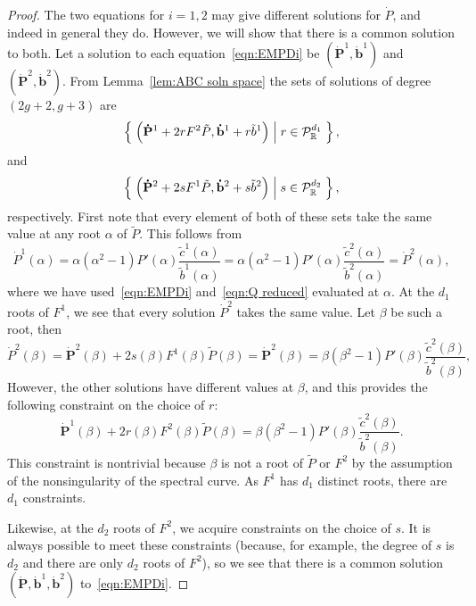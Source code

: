 \documentclass{article}
\begin{document}
\begin{lem}[Case (a)]
\begin{proof}
The two equations for $i=1,2$ may give different solutions for $\dot P$, and indeed in general they do. However, we will show that there is a common solution to both. Let a solution to each equation~\eqref{eqn:EMPDi} be $(\mathbf{\dot{P}}^1, \mathbf{\dot{b}}^1)$ and $(\mathbf{\dot{P}}^2, \mathbf{\dot{b}}^2)$. From Lemma~\ref{lem:ABC soln space} the sets of solutions of degree $(2g+2,g+3)$ are
\[
\left\{\;  \left( \mathbf{\dot{P}}^1 + 2rF^2\tilde{P}, \mathbf{\dot{b}}^1 + r\tilde{b}^1 \right)  \;\middle|\;  r \in\mathcal{P}^{d_1}_{\mathbb{R}}  \;\right\},
\]
and
\[
\left\{\;  \left( \mathbf{\dot{P}}^2 + 2sF^1\tilde{P}, \mathbf{\dot{b}}^2 + s\tilde{b}^2 \right)  \;\middle|\;  s \in\mathcal{P}^{d_2}_{\mathbb{R}} \;\right\},
\]
respectively. First note that every element of both of these sets take the same value at any root $\alpha$ of $\tilde{P}$. This follows from
\[
\dot P^1(\alpha)
= \alpha (\alpha^2 - 1) P'(\alpha) \frac{\tilde{c}^1(\alpha)}{\tilde{b}^1(\alpha)}
= \alpha (\alpha^2 - 1) P'(\alpha) \frac{\tilde{c}^2(\alpha)}{\tilde{b}^2(\alpha)}
= \dot P^2(\alpha),
\]
where we have used~\eqref{eqn:EMPDi} and~\eqref{eqn:Q reduced} evaluated at $\alpha$.
At the $d_1$ roots of $F^1$, we see that every solution $\dot{P}^2$ takes the same value. Let $\beta$ be such a root, then
\[
\dot{P}^2(\beta)
= \mathbf{\dot{P}}^2(\beta) + 2s(\beta)F^1(\beta)\tilde{P}(\beta)
= \mathbf{\dot{P}}^2(\beta)
= \beta (\beta^2-1) P'(\beta) \frac{\tilde{c}^2(\beta)}{\tilde{b}^2(\beta)},
\]
However, the other solutions have different values at $\beta$, and this provides the following constraint on the choice of $r$:
\[
\mathbf{\dot{P}}^1(\beta) + 2r(\beta)F^2(\beta)\tilde{P}(\beta) 
= \beta (\beta^2-1) P'(\beta) \frac{\tilde{c}^2(\beta)}{\tilde{b}^2(\beta)}.
\]
This constraint is nontrivial because $\beta$ is not a root of $\tilde{P}$ or $F^2$ by the assumption of the nonsingularity of the spectral curve. As $F^1$ has $d_1$ distinct roots, there are $d_1$ constraints.

Likewise, at the $d_2$ roots of $F^2$, we acquire constraints on the choice of $s$. It is always possible to meet these constraints (because, for example, the degree of $s$ is $d_2$ and there are only $d_2$ roots of $F^2$), so we see that there is a common solution $(\mathbf{\dot{P}}, \mathbf{\dot{b}}^1, \mathbf{\dot{b}}^2)$ to~\eqref{eqn:EMPDi}.


\end{proof}
\end{lem}
\end{document}
